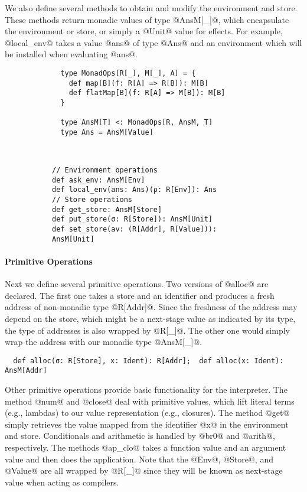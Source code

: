We also define several methods to obtain and modify the environment and store.
These methods return monadic values of type @AnsM[_]@, which encapsulate the 
environment or store, or simply a @Unit@ value for effects.
For example, @local_env@ takes a value @ans@ of type @Ans@ and an environment 
which will be installed when evaluating @ans@.

\begin{figure}[h!]
  \centering
  \begin{subfigure}[b]{0.45\textwidth}
    \begin{lstlisting}
  type MonadOps[R[_], M[_], A] = {
    def map[B](f: R[A] => R[B]): M[B]
    def flatMap[B](f: R[A] => M[B]): M[B]
  }
  
  type AnsM[T] <: MonadOps[R, AnsM, T]
  type Ans = AnsM[Value]
    \end{lstlisting}
  \end{subfigure}
  ~
  \begin{subfigure}[b]{0.55\textwidth}
    \begin{lstlisting}
// Environment operations
def ask_env: AnsM[Env]
def local_env(ans: Ans)(ρ: R[Env]): Ans
// Store operations
def get_store: AnsM[Store]
def put_store(σ: R[Store]): AnsM[Unit]
def set_store(av: (R[Addr], R[Value])): AnsM[Unit]
    \end{lstlisting}
  \end{subfigure}
\end{figure}

\paragraph{Primitive Operations} Next we define several primitive operations.
Two versions of @alloc@ are declared. The first one takes a store and an
identifier and produces a fresh address of non-monadic type @R[Addr]@. Since
the freshness of the address may depend on the store, which might be a
next-stage value as indicated by its type, the type of addresses is also wrapped
by @R[_]@. The other one would simply wrap the address with our monadic type
@AnsM[_]@.
\begin{lstlisting}
  def alloc(σ: R[Store], x: Ident): R[Addr];  def alloc(x: Ident): AnsM[Addr]
\end{lstlisting}

Other primitive operations provide basic functionality for the interpreter.
The method @num@ and @close@ deal with primitive values, which lift literal
terms (e.g., lambdas) to our value representation (e.g., closures).
The method @get@ simply retrieves the value mapped from the identifier @x@ in
the environment and store. Conditionals and arithmetic is handled by @br0@
and @arith@, respectively. The methods @ap_clo@ takes a function value and an
argument value and then does the application. Note that the @Env@, @Store@, and
@Value@ are all wrapped by @R[_]@ since they will be known as next-stage value
when acting as compilers.

